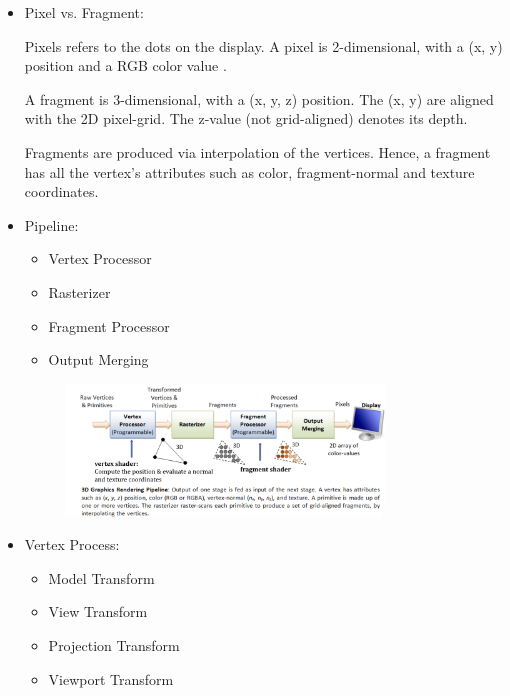 \documentclass{article}
\begin{document}
\begin{itemize}
\begin{itemize}
\begin{itemize}
\begin{itemize}
    \end{itemize}
\end{itemize}

\item Pixel vs. Fragment:

Pixels refers to the dots on the display. A pixel is 2-dimensional, with a (x, y) position and a RGB color value .

A fragment is 3-dimensional, with a (x, y, z) position. The (x, y) are aligned with the 2D pixel-grid. The z-value (not grid-aligned) denotes its depth.


Fragments are produced via interpolation of the vertices. Hence, a fragment has all the vertex's attributes such as color, fragment-normal and texture coordinates.


\item Pipeline:
\begin{itemize}
    \item Vertex Processor
    \item Rasterizer
    \item Fragment Processor
    \item Output Merging
\end{itemize}
\begin{figure}[H]
    \centering
    \includegraphics[width=0.8\textwidth]{imgs/pipeline.jpeg}
    
    
\end{figure}

\item Vertex Process:
\begin{itemize}
    \item Model Transform
    \item View Transform
    \item Projection Transform
    \item Viewport Transform
\end{itemize}


\end{itemize}
\end{itemize}
\end{document}
